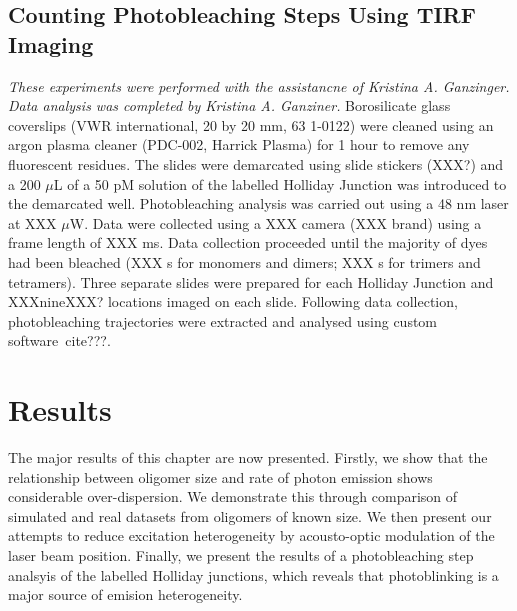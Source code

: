 \subsection{Counting Photobleaching Steps Using TIRF Imaging}
\textit{These experiments were performed with the assistancne of Kristina A. Ganzinger. Data analysis was completed by Kristina A. Ganziner.}
Borosilicate glass coverslips (VWR international, 20 by 20 mm, 63 1-0122) were cleaned using an argon plasma cleaner (PDC-002, Harrick Plasma) for 1 hour to remove any fluorescent residues. The slides were demarcated using slide stickers (XXX?) and a 200 $\mu$L of a 50 pM solution of the labelled Holliday Junction was introduced to the demarcated well. Photobleaching analysis was carried out using a 48 nm laser at XXX $\mu$W. Data were collected using a XXX camera (XXX brand) using a frame length of XXX ms. Data collection proceeded until the majority of dyes had been bleached (XXX s for monomers and dimers; XXX s for trimers and tetramers). Three separate slides were prepared for each Holliday Junction and XXXnineXXX? locations imaged on each slide. Following data collection, photobleaching trajectories were extracted and analysed using custom software~cite{???}.

\section{Results}
The major results of this chapter are now presented. Firstly, we show that the relationship between oligomer size and rate of photon emission shows considerable over-dispersion. We demonstrate this through comparison of simulated and real datasets from oligomers of known size. We then present our attempts to reduce excitation heterogeneity by acousto-optic modulation of the laser beam position. Finally, we present the results of a photobleaching step analsyis of the labelled Holliday junctions, which reveals that photoblinking is a major source of emision heterogeneity.

